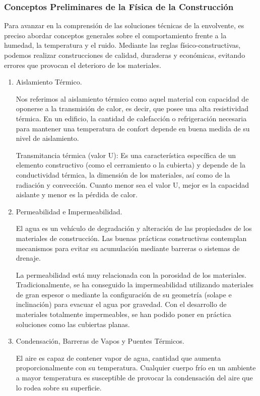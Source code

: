 \subsubsection*{Conceptos Preliminares de la Física de la Construcción}

Para avanzar en la comprensión de las soluciones técnicas de la envolvente, es preciso abordar conceptos generales sobre el comportamiento frente a la humedad, la temperatura y el ruido. Mediante las reglas físico-constructivas, podemos realizar construcciones de calidad, duraderas y económicas, evitando errores que provocan el deterioro de los materiales.

\begin{enumerate}
    \item Aislamiento Térmico.
    
Nos referimos al aislamiento térmico como aquel material con capacidad de oponerse a la transmisión de calor, es decir, que posee una alta resistividad térmica. En un edificio, la cantidad de calefacción o refrigeración necesaria para mantener una temperatura de confort depende en buena medida de su nivel de aislamiento.

Transmitancia térmica (valor U): Es una característica específica de un elemento constructivo (como el cerramiento o la cubierta) y depende de la conductividad térmica, la dimensión de los materiales, así como de la radiación y convección. Cuanto menor sea el valor U, mejor es la capacidad aislante y menor es la pérdida de calor.

    \item Permeabilidad e Impermeabilidad.
    
El agua es un vehículo de degradación y alteración de las propiedades de los materiales de construcción. Las buenas prácticas constructivas contemplan mecanismos para evitar su acumulación mediante barreras o sistemas de drenaje.

La permeabilidad está muy relacionada con la porosidad de los materiales. Tradicionalmente, se ha conseguido la impermeabilidad utilizando materiales de gran espesor o mediante la configuración de su geometría (solape e inclinación) para evacuar el agua por gravedad. Con el desarrollo de materiales totalmente impermeables, se han podido poner en práctica soluciones como las cubiertas planas.

    \item Condensación, Barreras de Vapos y Puentes Térmicos.
    
El aire es capaz de contener vapor de agua, cantidad que aumenta proporcionalmente con su temperatura. Cualquier cuerpo frío en un ambiente a mayor temperatura es susceptible de provocar la condensación del aire que lo rodea sobre su superficie.


\end{enumerate}
